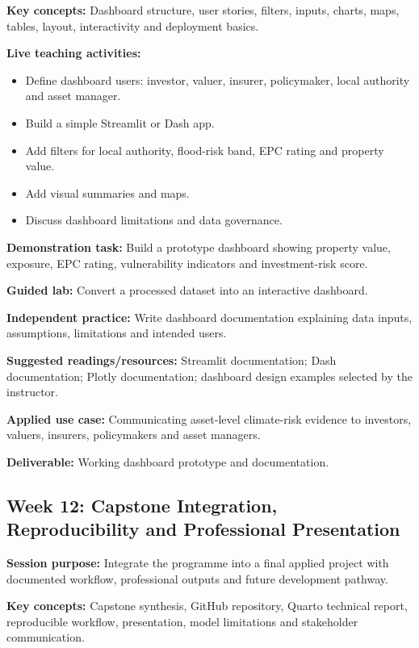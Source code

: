 \documentclass[
  a4paper,
]{article}
\providecommand{\tightlist}{%
  \setlength{\itemsep}{0pt}\setlength{\parskip}{0pt}}
\begin{document}
\textbf{Key concepts:} Dashboard structure, user stories, filters,
inputs, charts, maps, tables, layout, interactivity and deployment
basics.

\textbf{Live teaching activities:}

\begin{itemize}
\tightlist
\item
  Define dashboard users: investor, valuer, insurer, policymaker, local
  authority and asset manager.
\item
  Build a simple Streamlit or Dash app.
\item
  Add filters for local authority, flood-risk band, EPC rating and
  property value.
\item
  Add visual summaries and maps.
\item
  Discuss dashboard limitations and data governance.
\end{itemize}

\textbf{Demonstration task:} Build a prototype dashboard showing
property value, exposure, EPC rating, vulnerability indicators and
investment-risk score.

\textbf{Guided lab:} Convert a processed dataset into an interactive
dashboard.

\textbf{Independent practice:} Write dashboard documentation explaining
data inputs, assumptions, limitations and intended users.

\textbf{Suggested readings/resources:} Streamlit documentation; Dash
documentation; Plotly documentation; dashboard design examples selected
by the instructor.

\textbf{Applied use case:} Communicating asset-level climate-risk
evidence to investors, valuers, insurers, policymakers and asset
managers.

\textbf{Deliverable:} Working dashboard prototype and documentation.

\subsection{Week 12: Capstone Integration, Reproducibility and
Professional
Presentation}\label{week-12-capstone-integration-reproducibility-and-professional-presentation}

\textbf{Session purpose:} Integrate the programme into a final applied
project with documented workflow, professional outputs and future
development pathway.

\textbf{Key concepts:} Capstone synthesis, GitHub repository, Quarto
technical report, reproducible workflow, presentation, model limitations
and stakeholder communication.
\end{document}

